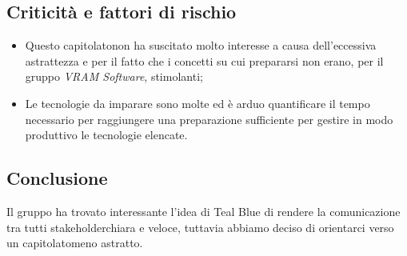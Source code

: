 \subsection{Criticità e fattori di rischio}
\begin{itemize}
	\item Questo capitolato\glosp non ha suscitato molto interesse a causa dell'eccessiva astrattezza e per il fatto che i concetti su cui prepararsi non erano, per il gruppo \textit{VRAM Software}, stimolanti;
	\item Le tecnologie da imparare sono molte ed è arduo quantificare il tempo necessario per raggiungere una preparazione sufficiente per gestire in modo produttivo le tecnologie elencate.
\end{itemize}
\subsection{Conclusione}
Il gruppo ha trovato interessante l'idea di Teal Blue di rendere la comunicazione tra tutti stakeholder\glosp chiara e veloce, tuttavia abbiamo deciso di orientarci verso un capitolato\glosp meno astratto.
